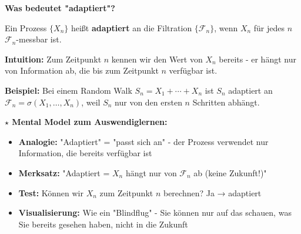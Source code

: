 \begin{denoobification}[Filtration]
\begin{center}
\end{center}
\end{denoobification}

\begin{denoobification}[Adaptiert]
\textbf{Was bedeutet "adaptiert"?}

Ein Prozess $\{X_n\}$ heißt \textbf{adaptiert} an die Filtration $\{\mathcal{F}_n\}$, wenn $X_n$ für jedes $n$ $\mathcal{F}_n$-messbar ist.

\textbf{Intuition:} Zum Zeitpunkt $n$ kennen wir den Wert von $X_n$ bereits - er hängt nur von Information ab, die bis zum Zeitpunkt $n$ verfügbar ist.

\textbf{Beispiel:} Bei einem Random Walk $S_n = X_1 + \cdots + X_n$ ist $S_n$ adaptiert an $\mathcal{F}_n = \sigma(X_1, \ldots, X_n)$, weil $S_n$ nur von den ersten $n$ Schritten abhängt.

\textbf{$\star$ Mental Model zum Auswendiglernen:}
\begin{itemize}
    \item \textbf{Analogie:} "Adaptiert" = "passt sich an" - der Prozess verwendet nur Information, die bereits verfügbar ist
    \item \textbf{Merksatz:} "Adaptiert = $X_n$ hängt nur von $\mathcal{F}_n$ ab (keine Zukunft!)"
    \item \textbf{Test:} Können wir $X_n$ zum Zeitpunkt $n$ berechnen? Ja → adaptiert
    \item \textbf{Visualisierung:} Wie ein "Blindflug" - Sie können nur auf das schauen, was Sie bereits gesehen haben, nicht in die Zukunft
\end{itemize}
\end{denoobification}

